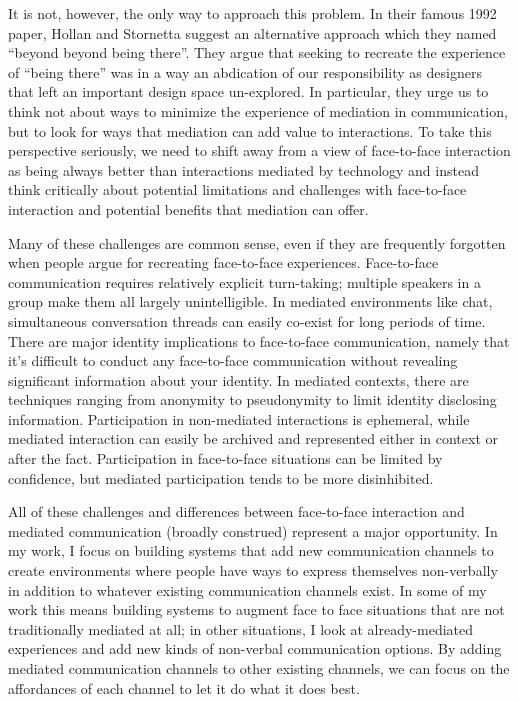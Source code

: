 \documentclass{tufte-handout}
\begin{document}
It is not, however, the only way to approach this problem. In their famous 1992 paper, Hollan and Stornetta \citet{beyond_being_there} suggest an alternative approach which they named ``beyond beyond being there''. They argue that seeking to recreate the experience of ``being there'' was in a way an abdication of our responsibility as designers that left an important design space un-explored. In particular, they urge us to think not about ways to minimize the experience of mediation in communication, but to look for ways that mediation can add value to interactions. To take this perspective seriously, we need to shift away from a view of face-to-face interaction as being always better than interactions mediated by technology and instead think critically about potential limitations and challenges with face-to-face interaction and potential benefits that mediation can offer. 


Many of these challenges are common sense, even if they are frequently forgotten when people argue for recreating face-to-face experiences. Face-to-face communication requires relatively explicit turn-taking; multiple speakers in a group make them all largely unintelligible. In mediated environments like chat, simultaneous conversation threads can easily co-exist for long periods of time. There are major identity implications to face-to-face communication, namely that it's difficult to conduct any face-to-face communication without revealing significant information about your identity. In mediated contexts, there are techniques ranging from anonymity to pseudonymity to limit identity disclosing information. Participation in non-mediated interactions is ephemeral, while mediated interaction can easily be archived and represented either in context or after the fact. Participation in face-to-face situations can be limited by confidence, but mediated participation tends to be more disinhibited. \citet{???}


All of these challenges and differences between face-to-face interaction and  mediated communication (broadly construed) represent a major opportunity. In my work, I focus on building systems that add new communication channels to create environments where people have ways to express themselves non-verbally in addition to whatever existing communication channels exist. In some of my work this means building systems to augment face to face situations that are not traditionally mediated at all; in other situations, I look at already-mediated experiences and add new kinds of non-verbal communication options. By adding mediated communication channels to other existing channels, we can focus on the affordances of each channel to let it do what it does best.
\end{document}
